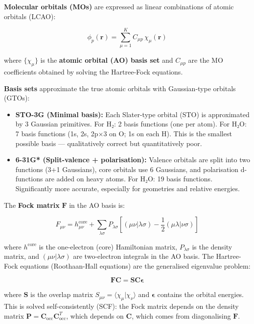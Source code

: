 \documentclass[
  11pt,
]{report}
\begin{document}
\textbf{Molecular orbitals (MOs)} are expressed as linear combinations
of atomic orbitals (LCAO):

\[\phi_p(\mathbf{r}) = \sum_{\mu=1}^{K} C_{\mu p}\, \chi_\mu(\mathbf{r})\]

where \(\{\chi_\mu\}\) is the \textbf{atomic orbital (AO) basis set} and
\(C_{\mu p}\) are the MO coefficients obtained by solving the
Hartree-Fock equations.

\textbf{Basis sets} approximate the true atomic orbitals with
Gaussian-type orbitals (GTOs):

\begin{itemize}
\item
  \textbf{STO-3G (Minimal basis):} Each Slater-type orbital (STO) is
  approximated by 3 Gaussian primitives. For H₂: 2 basis functions (one
  per atom). For H₂O: 7 basis functions (1s, 2s, 2p×3 on O; 1s on each
  H). This is the smallest possible basis --- qualitatively correct but
  quantitatively poor.
\item
  \textbf{6-31G* (Split-valence + polarisation):} Valence orbitals are
  split into two functions (3+1 Gaussians), core orbitals use 6
  Gaussians, and polarisation d-functions are added on heavy atoms. For
  H₂O: 19 basis functions. Significantly more accurate, especially for
  geometries and relative energies.
\end{itemize}

The \textbf{Fock matrix} \(\mathbf{F}\) in the AO basis is:

\[F_{\mu\nu} = h_{\mu\nu}^{\text{core}} + \sum_{\lambda\sigma} P_{\lambda\sigma}\left[(\mu\nu|\lambda\sigma) - \frac{1}{2}(\mu\lambda|\nu\sigma)\right]\]

where \(h^{\text{core}}\) is the one-electron (core) Hamiltonian matrix,
\(P_{\lambda\sigma}\) is the density matrix, and
\((\mu\nu|\lambda\sigma)\) are two-electron integrals in the AO basis.
The Hartree-Fock equations (Roothaan-Hall equations) are the generalised
eigenvalue problem:

\[\mathbf{F}\mathbf{C} = \mathbf{S}\mathbf{C}\boldsymbol{\epsilon}\]

where \(\mathbf{S}\) is the overlap matrix
\(S_{\mu\nu} = \langle\chi_\mu|\chi_\nu\rangle\) and
\(\boldsymbol{\epsilon}\) contains the orbital energies. This is solved
self-consistently (SCF): the Fock matrix depends on the density matrix
\(\mathbf{P} = \mathbf{C}_{\text{occ}}\mathbf{C}_{\text{occ}}^T\), which
depends on \(\mathbf{C}\), which comes from diagonalising
\(\mathbf{F}\).
\end{document}
